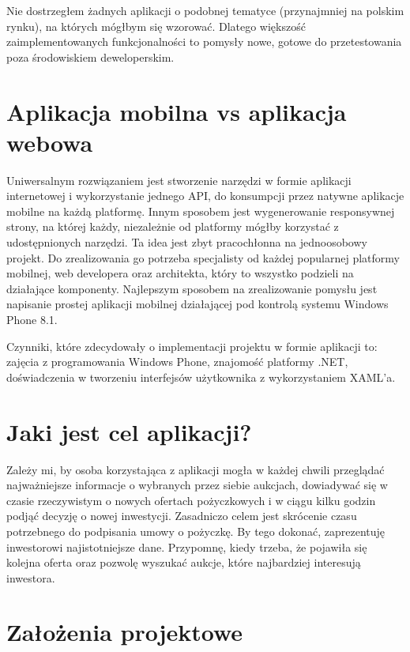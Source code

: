 \documentclass[a4paper,twoside,titlepage,openright]{book}
\begin{document}
Nie dostrzegłem żadnych aplikacji o podobnej tematyce (przynajmniej na polskim rynku), na których mógłbym się wzorować. Dlatego większość zaimplementowanych funkcjonalności to pomysły nowe, gotowe do przetestowania poza środowiskiem deweloperskim.

\section*{Aplikacja mobilna vs aplikacja webowa}

Uniwersalnym rozwiązaniem jest stworzenie narzędzi w formie aplikacji internetowej i wykorzystanie jednego API, do konsumpcji przez natywne aplikacje mobilne na każdą platformę. Innym sposobem jest wygenerowanie responsywnej strony, na której każdy, niezależnie od platformy mógłby korzystać z udostępnionych narzędzi. Ta idea jest zbyt pracochłonna na jednoosobowy projekt. Do zrealizowania go potrzeba specjalisty od każdej popularnej platformy mobilnej, web developera oraz architekta, który to wszystko podzieli na działające komponenty. Najlepszym sposobem na zrealizowanie pomysłu jest napisanie prostej aplikacji mobilnej działającej pod kontrolą systemu Windows Phone 8.1. 

Czynniki, które zdecydowały o implementacji projektu w formie aplikacji to: zajęcia z programowania Windows Phone, znajomość platformy .NET, doświadczenia w tworzeniu interfejsów użytkownika z wykorzystaniem XAML'a.

\section*{Jaki jest cel aplikacji?}

Zależy mi, by osoba korzystająca z aplikacji mogła w każdej chwili przeglądać najważniejsze informacje o wybranych przez siebie aukcjach, dowiadywać się w czasie rzeczywistym o nowych ofertach pożyczkowych i w ciągu kilku godzin podjąć decyzję o nowej inwestycji. Zasadniczo celem jest skrócenie czasu potrzebnego do podpisania umowy o pożyczkę. By tego dokonać, zaprezentuję inwestorowi najistotniejsze dane. Przypomnę, kiedy trzeba, że pojawiła się kolejna oferta oraz pozwolę wyszukać aukcje, które najbardziej interesują inwestora.

\section*{Założenia projektowe}
\end{document}
